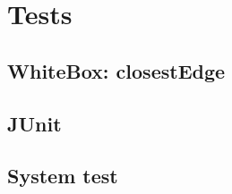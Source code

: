 \chapter{Tests}
\label{TEST}
\section{WhiteBox: closestEdge}
\label{TEST-CE}

\section{JUnit}
\label{TEST-JU}

\section{System test}
\label{TEST-ST}